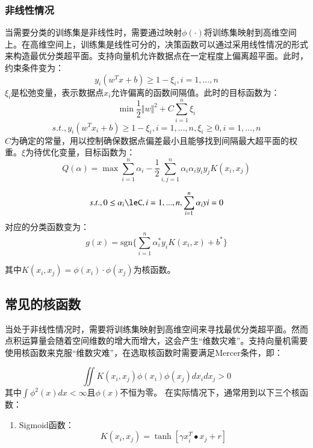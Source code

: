\subsubsection{非线性情况} 
当需要分类的训练集是非线性时，需要通过映射$\phi(\cdot)$将训练集映射到高维空间上。在高维空间上，训练集是线性可分的，决策函数可以通过采用线性情况的形式来构造最优分类超平面。支持向量机允许数据点在一定程度上偏离超平面。此时，约束条件变为：
\begin{equation}
y_{i}(w^{T}x+b)\ge 1-\xi_{i},i=1,...,n
\end{equation}
$\xi_{i}$是松弛变量，表示数据点$x_{i}$允许偏离的函数间隔值。此时的目标函数为：
\begin{equation}
\min\frac{1}{2}\Vert{w}\Vert^{2}+C\sum_{i=1}^{n}\xi_{i}
\end{equation}
\begin{equation}
s.t.,y_{i}(w^{T}x_{i}+b)\ge1-\xi_{i},i=1,...,n,\xi_{i}\ge0,i=1,...,n
\end{equation}
$C$为确定的常量，用以控制确保数据点偏差最小且能够找到间隔最大超平面的权重。$\xi$为待优化变量，目标函数为：
\begin{equation}
Q(\alpha)=\max \sum_{i=1}^{n}\alpha_{i}-\frac{1}{2}\sum_{i,j=1}^{n}\alpha_{i}\alpha_{i}y_{i}y_{j}K(x_{i},x_{j})
\end{equation}

\begin{equation}
s.t.,0\le\alpha_{i}\leC,i=1,...,n,\sum_{i=1}^{n}\alpha_{i}y{i}=0
\end{equation}
对应的分类函数变为：
\begin{equation}
g(x)=\textrm{sgn}\Big \{\sum_{i=1}^{n}\alpha_{i}^{*}y_{i}K(x_{i},x)+b^{*}\Big \}
\end{equation}

其中$K(x_{i},x_{j})=\phi(x_{i})\cdot\phi(x_{j})$为核函数。

\subsection{常见的核函数} 
当处于非线性情况时，需要将训练集映射到高维空间来寻找最优分类超平面。然而点积运算量会随着空间维数的增大而增大，这会产生“维数灾难”。支持向量机需要使用核函数来克服“维数灾难”，在选取核函数时需要满足Mercer条件，即：

\begin{equation}
\iint K(x_{i},x_{j})\phi(x_{i})\phi(x_{j})dx_{i}dx_{j}>0
\end{equation}
其中$\int\phi^{2}(x)dx<\infty$且$\phi(x)$不恒为零。
在实际情况下，通常用到以下三个核函数：
\begin{enumerate}
：
\begin{equation}
K(x_{i},x_{j})=[\gamma x_{i}\bullet x_{j}+r]^{d}
\end{equation}
：
\begin{equation}
K(x_{i},x_{j})=\exp\Big\{-\frac{\Vert x-x_{i}\Vert^{2}}{\sigma^{2}}\Big\}
\end{equation}
\item Sigmoid函数：
\begin{equation}
K(x_{i},x_{j})=\tanh[\gamma x_{i}^{T}\bullet x_{j}+r]
\end{equation}
\end{enumerate}

